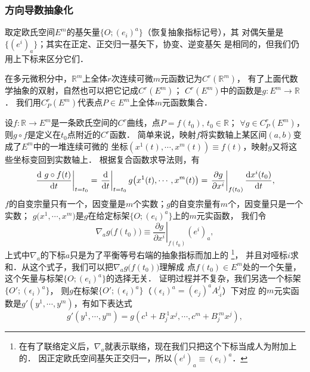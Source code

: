 \subsubsection{方向导数抽象化}\label{chdm:sec_ed}
取定欧氏空间$E^m$的基矢量$\{O;(e_i)^a\}$（恢复抽象指标记号），其
对偶矢量是$\{(e^i)_a\}$；其实在正定、正交归一基矢下，协变、逆变基矢
是相同的，但我们仍用上下标来区分它们．

在多元微积分中，$\mathbb{R}^m$上全体$r$次连续可微$m$元函数记为$C^r(\mathbb{R}^m)$，
有了上面代数学抽象的双射，自然也可以把它记成$C^r(E^m)$；
$C^r(E^m)$中的函数是$g:E^m \to \mathbb{R}$．
我们用$C^r_P(E^m)$代表点$P\in E^m$上全体$m$元函数集合．

设$f:\mathbb{R}\to E^m$是一条欧氏空间的$C^r$曲线，点$P=f(t_0),\, t_0\in \mathbb{R}$；
$\forall g\in C^r_P(E^m)$，则$g\circ f$是定义在$t_0$点附近的$C^r$函数．
简单来说，映射$f$将实数轴上某区间$(a,b)$变成了$E^m$中的一堆连续可微的
坐标$(x^1(t),\cdots, x^m(t))\equiv f(t)$，映射$g$又将这些坐标变回到实数轴上．
根据复合函数求导法则，有
\begin{equation}\label{chdm:eqn_dgf}
    \left.\frac{{\rm d}\ g\circ f(t)}{{\rm d}t}\right| _{t=t_0} =
     \left.\frac{{\rm d} }{{\rm d}t}\right| _{t=t_0}
     g\bigl(x^1(t),\cdots, x^m(t)\bigr)
     =\left.\frac{\partial g}{\partial x^i}\right| _{f(t_0)}
     \frac{{\rm d} x^i(t_0)}{{\rm d}t} ,
\end{equation}
$f$的自变宗量只有一个，因变量是$m$个实数；$g$的自变宗量有$m$个，因变量只是一个实数；
$g\bigl(x^1,\cdots, x^m\bigr)$是$g$在给定标架$\{O;(e_i)^a\}$上的$m$元实函数，
我们令
\begin{equation}\label{chdm:eqn_ngea}
    \nabla_a g\bigl(f(t_0)\bigr) \equiv 
    \left.\frac{\partial g}{\partial x^i}\right| _{f(t_0)}(e^i)_a ,
\end{equation}
上式中$\nabla_a$的下标$a$只是为了平衡等号右端的抽象指标而加上的
{\footnote{在有了联络定义后，$\nabla_a$就表示联络，现在我们只把这个下标当成人为附加上的．
因正定欧氏空间基矢正交归一，所以$(e^i)_a\equiv (e_i)^a$．}}，
并且对哑标$i$求和．从这个式子，我们可以把$\nabla_a g\bigl(f(t_0)\bigr)$理解成
点$f(t_0)\in E^m$处的一个矢量，这个矢量与标架$\{O;(e_i)^a\}$的选择无关．
证明过程并不复杂，我们另选一个标架$\{O';(\epsilon_i)^a\}$，
则$g$在标架$\{O';(\epsilon_i)^a\}$（$(\epsilon_i)^a=(e_j)^a A^j_{\cdot i}$）下对应
的$m$元实函数是$g'(y^1,\cdots,y^m)$，有如下表达式
\begin{equation}\label{chdm:eqn_gpgB}
    g'(y^1,\cdots,y^m)=g(c^1+B^{\cdot 1}_j x^j,\cdots,c^m+B^{\cdot m}_j x^j) ,
\end{equation}
